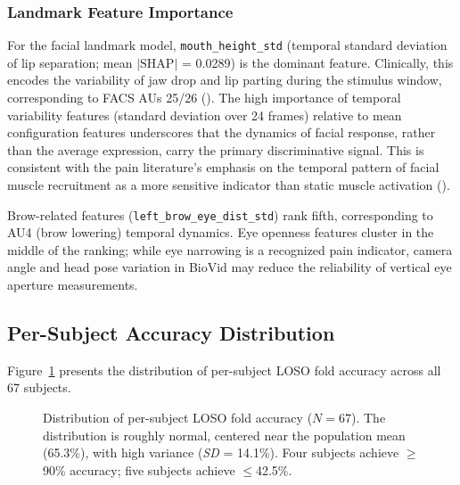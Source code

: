 \documentclass[10pt, twocolumn]{article}
\begin{document}
\subsubsection{Landmark Feature Importance}

For the facial landmark model, \texttt{mouth\_height\_std} (temporal standard deviation
of lip separation; mean $|\text{SHAP}|$ = 0.0289) is the dominant feature. Clinically,
this encodes the variability of jaw drop and lip parting during the stimulus window,
corresponding to FACS AUs 25/26 (\cite{Prkachin2008}). The high importance of temporal
variability features (standard deviation over 24 frames) relative to mean configuration
features underscores that the dynamics of facial response, rather than the average
expression, carry the primary discriminative signal. This is consistent with the pain
literature's emphasis on the temporal pattern of facial muscle recruitment as a more
sensitive indicator than static muscle activation (\cite{Kunz2019}).

Brow-related features (\texttt{left\_brow\_eye\_dist\_std}) rank fifth, corresponding to
AU4 (brow lowering) temporal dynamics. Eye openness features cluster in the middle of
the ranking; while eye narrowing is a recognized pain indicator, camera angle and head
pose variation in BioVid may reduce the reliability of vertical eye aperture measurements.

\subsection{Per-Subject Accuracy Distribution}

Figure~\ref{fig:persubj} presents the distribution of per-subject LOSO fold accuracy
across all 67 subjects.

\begin{figure}[ht]
\centering
{}
\caption{Distribution of per-subject LOSO fold accuracy ($N = 67$). The distribution is
roughly normal, centered near the population mean (65.3\%), with high variance
(\textit{SD} = 14.1\%). Four subjects achieve $\geq$90\% accuracy; five subjects achieve
$\leq$42.5\%.}
\label{fig:persubj}
\end{figure}
\end{document}
